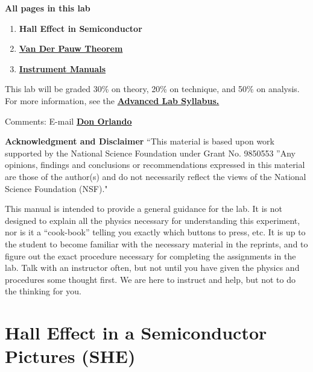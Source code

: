 \documentclass{../lab}
\begin{document}
\noindent\textbf{All pages in this lab}

\begin{enumerate}
    \item \textbf{Hall Effect in Semiconductor}

    \item \href{http://experimentationlab.berkeley.edu/node/105}{\textbf{Van Der Pauw Theorem}}
    
    \item \href{http://experimentationlab.berkeley.edu/node/106}{\textbf{Instrument Manuals}}
\end{enumerate}

This lab will be graded 30\% on theory, 20\% on technique, and 50\% on analysis. For more information, see the \href{http://experimentationlab.berkeley.edu/syllabus}{\textbf{Advanced Lab Syllabus.}}

Comments: E-mail \href{\MailDonOrlando}{\textbf{Don Orlando}}

\textbf{Acknowledgment and Disclaimer} ``This material is based upon work supported by the National Science Foundation under Grant No. 9850553 ''Any opinions, findings and conclusions or recommendations expressed in this material are those of the author(s) and do not necessarily reflect the views of the National Science Foundation (NSF)."

This manual is intended to provide a general guidance for the lab. It is not designed to explain all the physics necessary for understanding this experiment, nor is it a ``cook-book'' telling you exactly which buttons to press, etc. It is up to the student to become familiar with the necessary material in the reprints, and to figure out the exact procedure necessary for completing the assignments in the lab. Talk with an instructor often, but not until you have given the physics and procedures some thought first. We are here to instruct and help, but not to do the thinking for you.

\section{Hall Effect in a Semiconductor Pictures (SHE)}
\end{document}
